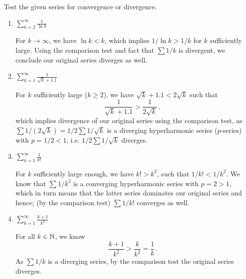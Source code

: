 \documentclass[week=6]{homework}
\date{\today}
\begin{document}
    \maketitle
    \thispagestyle{empty}
    \newpage
    \begin{questions}
		\let\firstquestion\question
		\renewcommand*{\question}{\vspace{7mm}\firstquestion}
        \firstquestion
        Test the given series for convergence or divergence.
        \begin{enumerate}[label=(\alph*)]
        	\item $\displaystyle \sum_{k=2}^{\infty} \frac{1}{\ln k}$
        	
        	For $k \to \infty$, we have $\ln k < k$, which implies $1/\ln k > 1/k$ for $k$ sufficiently large. Using the comparison test and fact that $\sum 1/k$ is divergent, we conclude our original series diverges as well.
        	
        	\item $\displaystyle \sum_{k=1}^{\infty} \frac{1}{\sqrt k + 1.1}$
        	
        	For $k$ sufficiently large ($k \geq 2$), we have $\sqrt k + 1.1 < 2\sqrt k$ such that
        	\[
	        	\frac{1}{\sqrt k + 1.1} > \frac{1}{2\sqrt k}\,,
        	\]
        	which implies divergence of our original series using the comparison test, as $\sum 1/(2\sqrt k) = 1/2 \sum 1/\sqrt k$ is a diverging hyperharmonic series ($p$-series) with $p = 1/2 < 1$, i.e. $1/2 \sum 1/\sqrt k$ diverges. 
        	
        	\addtocounter{enumi}{2}
        	\item $\displaystyle \sum_{k=1}^{\infty} \frac{1}{k!}$
        	
        	For $k$ sufficiently large enough, we have $k! > k^2$, such that $1/k! < 1/k^2$. We know that $\sum 1/k^2$ is a converging hyperharmonic series with $p = 2 > 1$, which in turn means that the latter series dominates our original series and hence; (by the comparison test) $\sum 1/k!$ converges as well.
        	
        	\item $\displaystyle \sum_{k=1}^{\infty} \frac{k+1}{k^2}$
        	
        	For all $k \in \mathbb{N}$, we know
        	\[
	        	\frac{k+1}{k^2} > \frac{k}{k^2} = \frac{1}{k}\,.
        	\]
        	As $\sum 1/k$ is a diverging series, by the comparison test the original series diverges.
        	

\end{enumerate}
\end{questions}
\end{document}
